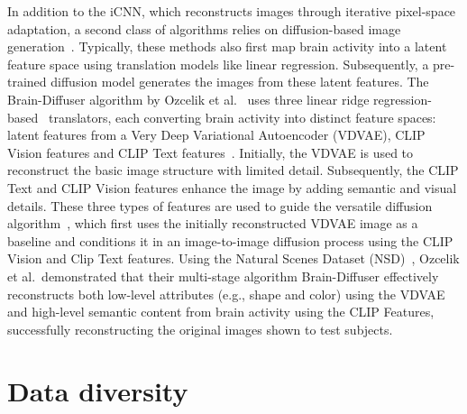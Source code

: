 In addition to the iCNN, which reconstructs images through iterative pixel-space adaptation, a second class of algorithms relies on diffusion-based image generation~\cite{takagiHighResolutionImageReconstruction,ozcelikNaturalSceneReconstruction2023,scottiMindEye2SharedSubjectModels2024}. Typically, these methods also first map brain activity into a latent feature space using translation models like linear regression. Subsequently, a pre-trained diffusion model generates the images from these latent features. The Brain-Diffuser algorithm by Ozcelik et al.~\cite{ozcelikNaturalSceneReconstruction2023} uses three linear ridge regression-based~\cite{hoerlRidgeRegressionBiased1970} translators, each converting brain activity into distinct feature spaces: latent features from a Very Deep Variational Autoencoder (VDVAE)\cite{childVeryDeepVAEs2020},  CLIP Vision features and CLIP Text features~\cite{radfordLearningTransferableVisual2021}. Initially, the VDVAE is used to reconstruct the basic image structure with limited detail. Subsequently, the CLIP Text and CLIP Vision features enhance the image by adding semantic and visual details. These three types of features are used to guide the versatile diffusion algorithm~\cite{xuVersatileDiffusionText2024}, which first uses the initially reconstructed VDVAE image as a baseline and conditions it in an image-to-image diffusion process using the CLIP Vision and Clip Text features. Using the Natural Scenes Dataset (NSD)~\cite{allenMassive7TFMRI2022}, Ozcelik et al.\ demonstrated that their multi-stage algorithm Brain-Diffuser effectively reconstructs both low-level attributes (e.g., shape and color) using the VDVAE and high-level semantic content from brain activity using the CLIP Features, successfully reconstructing the original images shown to test subjects.




\section{Data diversity}


